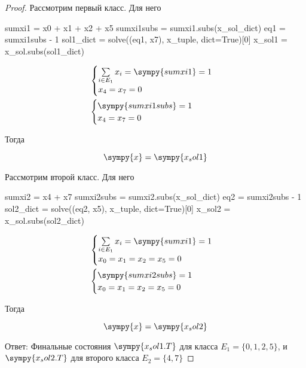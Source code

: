 \begin{proof}
    Рассмотрим первый класс. Для него
    \begin{sympycode}
sumxi1 = x0 + x1 + x2 + x5
sumxi1subs = sumxi1.subs(x_sol_dict)
eq1 = sumxi1subs - 1
sol1_dict = solve((eq1, x7), x_tuple, dict=True)[0]
x_sol1 = x_sol.subs(sol1_dict)
\end{sympycode}
    \[
        \begin{aligned}
             & \begin{cases}
                   \sum\limits_{i \in E_1} x_i  = \sympy{sumxi1} = 1 \\
                   x_4                          = x_7 = 0            \\
               \end{cases}
            \\
             & \begin{cases}
                   \sympy{sumxi1subs}  = 1       \\
                   x_4                 = x_7 = 0 \\
               \end{cases}
        \end{aligned}
    \]

    Тогда

    \[
        \sympy{x} = \sympy{x_sol1}
    \]

    Рассмотрим второй класс. Для него

    \begin{sympycode}
sumxi2 = x4 + x7
sumxi2subs = sumxi2.subs(x_sol_dict)
eq2 = sumxi2subs - 1
sol2_dict = solve((eq2, x5), x_tuple, dict=True)[0]
x_sol2 = x_sol.subs(sol2_dict)
\end{sympycode}

    \[
        \begin{aligned}
             & \begin{cases}
                   \sum\limits_{i \in E_1} x_i  = \sympy{sumxi1} = 1 \\
                   x_0 = x_1 = x_2 = x_5 = 0                         \\
               \end{cases}
            \\
             & \begin{cases}
                   \sympy{sumxi2subs}  = 1   \\
                   x_0 = x_1 = x_2 = x_5 = 0 \\
               \end{cases}
        \end{aligned}
    \]

    Тогда

    \[
        \sympy{x} = \sympy{x_sol2}
    \]

    Ответ: Финальные состояния \(\sympy{x_sol1.T}\) для класса $E_1 = \{0, 1, 2, 5\}$,
    и \(\sympy{x_sol2.T}\) для второго класса $E_2 = \{4, 7\}$ 
\end{proof}


